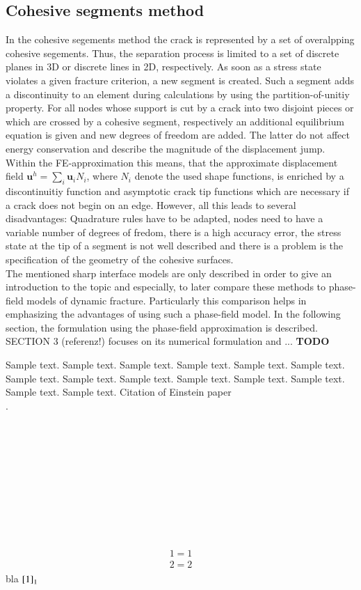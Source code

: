 \subsection{Cohesive segments method} \label{sec:intro_cohes}
In the cohesive segements method the crack is represented by a set of overalpping cohesive segements. Thus, the separation process is limited to a set of discrete planes in 3D or discrete lines in 2D, respectively. As soon as a stress state violates a given fracture criterion, a new segment is created. Such a segment adds a discontinuity to an element during calculations by using the partition-of-unitiy property. For all nodes whose support is cut by a crack into two disjoint pieces or which are crossed by a cohesive segment, respectively an additional equilibrium equation is given and new degrees of freedom are added. The latter do not affect energy conservation and describe the magnitude of the displacement jump. Within the FE-approximation this means, that the approximate displacement field $\mathbf{u}^{h}=\sum_{i}\mathbf{u}_{i}N_{i}$, where $N_{i}$ denote the used shape functions, is enriched by a discontinuitiy function and asymptotic crack tip functions which are necessary if a crack does not begin on an edge. However, all this leads to several disadvantages: Quadrature rules have to be adapted, nodes need to have a variable number of degrees of fredom, there is a high accuracy error, the stress state at the tip of a segment is not well described and there is a problem is the specification of the geometry of the cohesive surfaces. \cite{02_SotA_cohes}\cite{01_SotA_cohes_dyn}
\\[5mm]
%
The mentioned sharp interface models are only described in order to give an introduction to the topic and especially, to later compare these methods to phase-field models of dynamic fracture. Particularly this comparison helps in emphasizing the advantages of using such a phase-field model. In the following section, the formulation using the phase-field approximation is described. SECTION 3 (referenz!) focuses on its numerical formulation and ... \textbf{TODO}


Sample text. Sample text. Sample text. Sample text. Sample text. Sample text. 
Sample text. Sample text. Sample text. Sample text. Sample text. Sample text. 
Sample text. Sample text. Citation of Einstein paper~ \\\citet{01_B_LagrMech}. \\

\\
\citet{01_SotA_cohes_dyn} \\
\citet{02_SotA_cohes} \\
 \\
\citet{01_PF_dyn_brittle} \\
\citet{02_PF_HO_brittle} \\
\citet{03_PF_ductile} \\
\citet{04_PF_HO_finDef} \\
\citet{05_PF_ductile} \\
\citet{06_PF_ductile}

\begin{align}
\begin{aligned}   \label{1}
1=1 \\
2=2 
\end{aligned}
\end{align}
bla ${\eqref{1}}_{1}$


